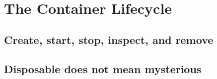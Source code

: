 \chapter{The Container Lifecycle}
\label{chap:lifecycle}

\section{Create, start, stop, inspect, and remove}

\section{Disposable does not mean mysterious}

